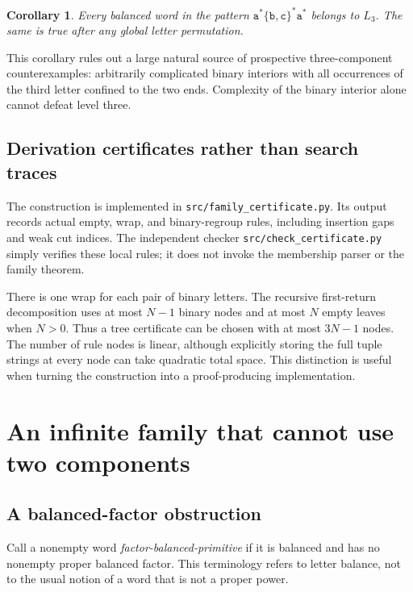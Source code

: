 \documentclass[11pt,letterpaper]{article}
\numberwithin{equation}{section}
\newtheorem{corollary}[theorem]{Corollary}
\theoremstyle{definition}
\theoremstyle{remark}
\renewcommand{\aa}{\mathtt a}
\newcommand{\bb}{\mathtt b}
\newcommand{\cc}{\mathtt c}
\newcommand{\word}[1]{\texttt{#1}}
\begin{document}
\begin{corollary}\label{cor:ends}
Every balanced word in the pattern \(\aa^{*}\{\bb,\cc\}^{*}\aa^{*}\)
belongs to \(L_3\). The same is true after any global letter permutation.
\end{corollary}

This corollary rules out a large natural source of prospective
three-component counterexamples: arbitrarily complicated binary interiors
with all occurrences of the third letter confined to the two ends.
Complexity of the binary interior alone cannot defeat level three.

\subsection{Derivation certificates rather than search traces}
The construction is implemented in \word{src/family\_certificate.py}.
Its output records actual empty, wrap, and binary-regroup rules, including
insertion gaps and weak cut indices. The independent checker
\word{src/check\_certificate.py} simply verifies these local rules;
it does not invoke the membership parser or the family theorem.

There is one wrap for each pair of binary letters. The recursive
first-return decomposition uses at most \(N-1\) binary nodes and at most
\(N\) empty leaves when \(N>0\). Thus a tree certificate can be chosen
with at most \(3N-1\) nodes. The number of rule nodes is linear, although
explicitly storing the full tuple strings at every node can take
quadratic total space. This distinction is useful when turning the
construction into a proof-producing implementation.

\section{An infinite family that cannot use two components}
\label{sec:negative}

\subsection{A balanced-factor obstruction}
Call a nonempty word \emph{factor-balanced-primitive} if it is balanced
and has no nonempty proper balanced factor. This terminology refers to
letter balance, not to the usual notion of a word that is not a proper
power.
\end{document}
